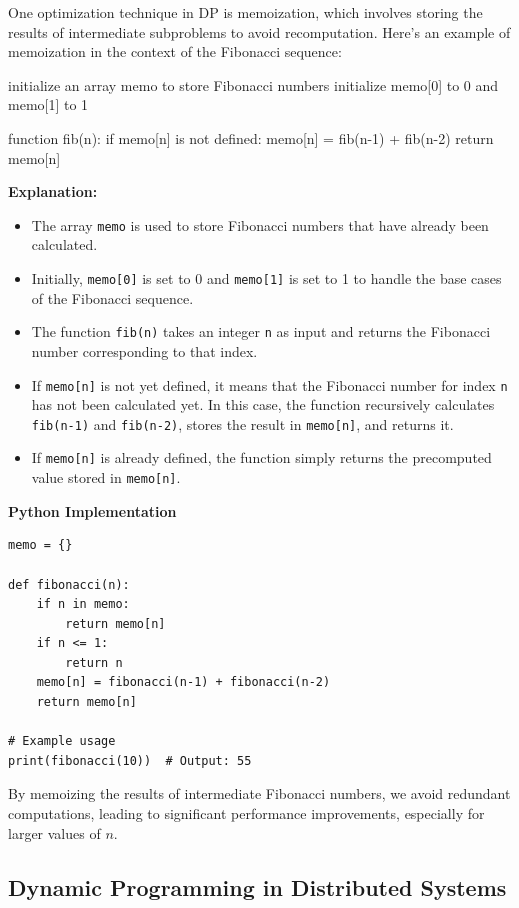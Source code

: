 \documentclass[12pt]{book} %
\begin{document}
One optimization technique in DP is memoization, which involves storing the results of intermediate subproblems to avoid recomputation. Here's an example of memoization in the context of the Fibonacci sequence:
\FloatBarrier
\begin{algorithm}
initialize an array memo to store Fibonacci numbers
initialize memo[0] to 0 and memo[1] to 1

function fib(n):
    if memo[n] is not defined:
        memo[n] = fib(n-1) + fib(n-2)
    return memo[n]  
\end{algorithm}
\FloatBarrier
\textbf{Explanation:}
\begin{itemize}
    \item The array \texttt{memo} is used to store Fibonacci numbers that have already been calculated.
    \item Initially, \texttt{memo[0]} is set to 0 and \texttt{memo[1]} is set to 1 to handle the base cases of the Fibonacci sequence.
    \item The function \texttt{fib(n)} takes an integer \texttt{n} as input and returns the Fibonacci number corresponding to that index.
    \item If \texttt{memo[n]} is not yet defined, it means that the Fibonacci number for index \texttt{n} has not been calculated yet. In this case, the function recursively calculates \texttt{fib(n-1)} and \texttt{fib(n-2)}, stores the result in \texttt{memo[n]}, and returns it.
    \item If \texttt{memo[n]} is already defined, the function simply returns the precomputed value stored in \texttt{memo[n]}.
\end{itemize}

\textbf{Python Implementation}
\begin{lstlisting}
memo = {}

def fibonacci(n):
    if n in memo:
        return memo[n]
    if n <= 1:
        return n
    memo[n] = fibonacci(n-1) + fibonacci(n-2)
    return memo[n]

# Example usage
print(fibonacci(10))  # Output: 55
\end{lstlisting}
\FloatBarrier
By memoizing the results of intermediate Fibonacci numbers, we avoid redundant computations, leading to significant performance improvements, especially for larger values of \( n \).



\subsection{Dynamic Programming in Distributed Systems}
\end{document}
